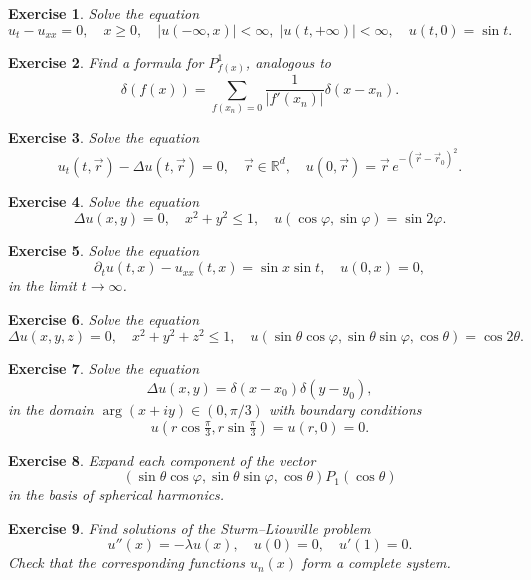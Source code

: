\documentclass[11pt,a4paper]{article}
\newtheorem*{exercise}{Exercise}
\begin{document}
\begin{exercise}
	Solve the equation
	\[
	u_t - u_{xx} = 0, \quad x \ge 0, \quad |u(-\infty, x)| < \infty, \; |u(t, +\infty)| < \infty, \quad u(t, 0) = \sin t.
	\]
\end{exercise}


\begin{exercise}
	Find a formula for $P^1_{f(x)}$, analogous to
	\[
	\delta(f(x)) = \sum_{f(x_n) = 0} \frac{1}{|f'(x_n)|}\delta(x - x_n).
	\]
\end{exercise}

\begin{exercise}
	Solve the equation
	\[
	u_t(t, \vec{r}) - \Delta u(t, \vec{r}) = 0, \quad \vec{r} \in \mathbb{R}^d, \quad u(0, \vec{r}) = \vec{r}\, e^{-(\vec{r} - \vec{r}_0)^2}.
	\]
\end{exercise}

\begin{exercise}
	Solve the equation
	\[
	\Delta u(x, y) = 0, \quad x^2 + y^2 \le 1, \quad u(\cos \varphi, \sin \varphi) = \sin 2\varphi.
	\]
\end{exercise}

\begin{exercise}
	Solve the equation
	\[
	\partial_t u(t, x) - u_{xx}(t, x) = \sin x \sin t, \quad u(0, x) = 0,
	\]
	in the limit $t \to \infty$.
\end{exercise}

\begin{exercise}
	Solve the equation
	\[
	\Delta u(x, y, z) = 0, \quad x^2 + y^2 + z^2 \le 1, \quad u(\sin\theta\cos\varphi, \sin\theta\sin\varphi, \cos\theta) = \cos 2\theta.
	\]
\end{exercise}

\begin{exercise}
	Solve the equation
	\[
	\Delta u(x, y) = \delta(x - x_0)\delta(y - y_0),
	\]
	in the domain $\arg(x + iy) \in (0, \pi/3)$ with boundary conditions
	\[
	u(r\cos \tfrac{\pi}{3}, r\sin \tfrac{\pi}{3}) = u(r, 0) = 0.
	\]
\end{exercise}

\begin{exercise}
	Expand each component of the vector
	\[
	(\sin\theta\cos\varphi, \sin\theta\sin\varphi, \cos\theta)P_1(\cos\theta)
	\]
	in the basis of spherical harmonics.
\end{exercise}

\begin{exercise}
	Find solutions of the Sturm–Liouville problem
	\[
	u''(x) = -\lambda u(x), \quad u(0) = 0, \quad u'(1) = 0.
	\]
	Check that the corresponding functions $u_n(x)$ form a complete system.
\end{exercise}
\end{document}
